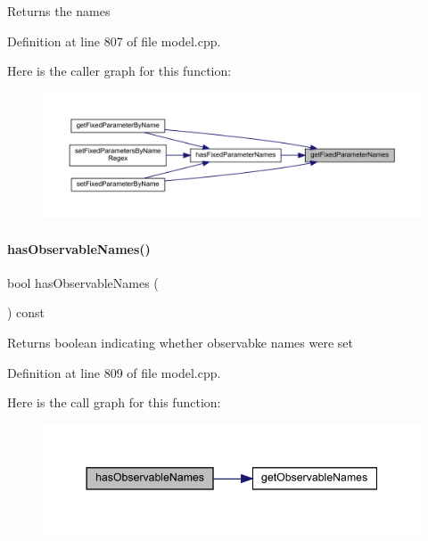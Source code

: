 \begin{DoxyReturn}{Returns}
the names 
\end{DoxyReturn}


Definition at line 807 of file model.\+cpp.

Here is the caller graph for this function\+:
\nopagebreak
\begin{figure}[H]
\begin{center}
\leavevmode
\includegraphics[width=350pt]{classamici_1_1_model_abdfc1bad63f4c3b927aac8c3422d639a_icgraph}
\end{center}
\end{figure}
\mbox{\label{classamici_1_1_model_aee41b755785a17eda8e67ec1462638b4}} 
\paragraph{\texorpdfstring{hasObservableNames()}{hasObservableNames()}}
{\footnotesize\ttfamily bool has\+Observable\+Names (\begin{DoxyParamCaption}{ }\end{DoxyParamCaption}) const\hspace{0.3cm}{\ttfamily [virtual]}}

\begin{DoxyReturn}{Returns}
boolean indicating whether observabke names were set 
\end{DoxyReturn}


Definition at line 809 of file model.\+cpp.

Here is the call graph for this function\+:
\nopagebreak
\begin{figure}[H]
\begin{center}
\leavevmode
\includegraphics[width=344pt]{classamici_1_1_model_aee41b755785a17eda8e67ec1462638b4_cgraph}
\end{center}
\end{figure}
\mbox{\label{classamici_1_1_model_aeac93945b3985b2c3a7c153bdb07679f}} 
